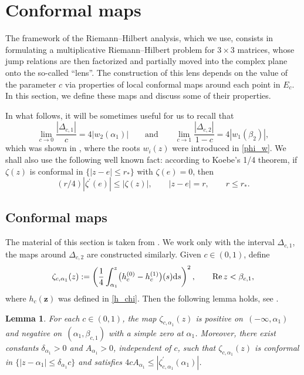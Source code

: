 \documentclass[pdftex]{sigma}
\numberwithin{equation}{section}
\newtheorem{Lemma}[Theorem]{Lemma}
\newcommand{\re}{\operatorname{Re} }
\newcommand{\z}	{{\boldsymbol z}}
\begin{document}
\section{Conformal maps}


The framework of the Riemann--Hilbert analysis, which we use, consists in formulating a multiplicative Riemann--Hilbert problem for $ 3\times3 $ matrices, whose jump relations are then factorized and partially moved into the complex plane onto the so-called ``lens''. The construction of this lens depends on the value of the parameter $ c $ via properties of local conformal maps around each point in $ E_c $. In this section, we define these maps and discuss some of their properties.

In what follows, it will be sometimes useful for us to recall that
\begin{equation}
\label{c-rate}
\lim_{c\to0} \frac{|\Delta_{c,1}|}c = 4|w_2(\alpha_1)| \qquad \text{and}\qquad  \lim_{c\to1} \frac{|\Delta_{c,2}|}{1-c} = 4|w_1(\beta_2)|,
\end{equation}
which was shown in \cite[equation~(4.8)]{ApDenYa21}, where the roots $ w_i(z) $ were introduced in \eqref{phi_w}. We shall also use the following well known fact: according to Koebe's 1/4 theorem, if $ \zeta(z) $ is conformal in $ \{|z-e|\leq r_*\} $ with $ \zeta(e)=0 $, then
\begin{equation}
\label{koebe}
(r/4)|\zeta^\prime(e)| \leq |\zeta(z)|, \qquad |z-e|=r, \qquad r\leq r_*.
\end{equation}

\subsection{Conformal maps}

The material of this section is taken from \cite[Section~7.4]{ApDenYa21}. We work only with the interval $ \Delta_{c,1} $, the maps around $ \Delta_{c,2} $ are constructed similarly. Given $ c\in(0,1) $, define
\begin{equation}
\label{4.1.1}
\zeta_{c,\alpha_1}(z) := \left(\frac14\int_{\alpha_1}^z\bigl(h_c^{(0)}-h_c^{(1)}\bigr)(s) {\rm d}s\right)^2, \qquad \re z<\beta_{c,1},
\end{equation}
where $ h_c(\z) $ was defined in \eqref{h_chi}. Then the following lemma holds, see \cite[Lemma~7.4]{ApDenYa21}.

\begin{Lemma}
\label{lem:4.1}
For each $ c\in(0,1) $, the map $ \zeta_{c,\alpha_1}(z) $ is positive on~$ (-\infty,\alpha_1) $ and negative on~$ (\alpha_1,\beta_{c,1}) $ with a simple zero at $ \alpha_1 $. Moreover, there exist constants $ \delta_{\alpha_1}>0 $ and $ A_{\alpha_1}>0 $, independent of $ c $, such that $ \zeta_{c,\alpha_1}(z) $ is conformal in $ \{|z-\alpha_1| \leq \delta_{\alpha_1}c \} $ and satisfies $ 4cA_{\alpha_1} \leq |\zeta^\prime_{c,\alpha_1}(\alpha_1)| $.
\end{Lemma}
\end{document}
